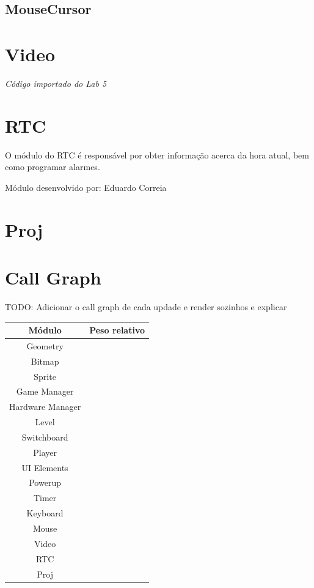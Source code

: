 \documentclass{report}
\begin{document}
\subsection{MouseCursor}

\paragraph{}

\section{Video}

\textit{Código importado do Lab 5}\footnotemark[\value{footnote}]

\section{RTC}

O módulo do RTC é responsável por obter informação acerca da hora atual, bem como programar alarmes. \newline

Módulo desenvolvido por: Eduardo Correia

\section{Proj}


\section{Call Graph}

TODO: Adicionar o call graph de cada updade e render sozinhos e explicar

\begin{center}
	\begin{tabular}{|c|c|} 
		\hline
			Módulo & Peso relativo \\ 
		\hline
		\hline
			Geometry & \\
			Bitmap & \\
			Sprite & \\
			Game Manager & \\
			Hardware Manager & \\
			Level & \\
			Switchboard & \\ 
			Player & \\
			UI Elements & \\
			Powerup & \\
			Timer & \\
			Keyboard & \\
			Mouse & \\
			Video & \\
			RTC & \\
			Proj & \\
		\hline
	\end{tabular}
\end{center}
\end{document}
